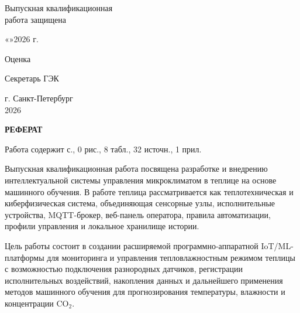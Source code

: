 \documentclass[a4paper,14pt]{extarticle}
\newcommand{\VkrStructuralSectionNoToc}[1]{%
  \begin{center}\bfseries #1\end{center}%
  \par\nopagebreak\vspace{12pt}%
}
\begin{document}
\begin{titlepage}
\vspace{0.4cm}

\begin{flushright}
\begin{minipage}{0.46\textwidth}
Выпускная квалификационная\\
работа защищена

\vspace{0.15cm}

«\underline{\hspace{0.8cm}}»\underline{\hspace{2.5cm}}2026 г.

\vspace{0.18cm}

Оценка

\vspace{0.12cm}

\underline{\hspace{3.0cm}}

\vspace{0.18cm}

Секретарь ГЭК \underline{\hspace{2.2cm}}
\end{minipage}
\end{flushright}

\vfill

\begin{center}
г. Санкт-Петербург\\
2026
\end{center}
\end{titlepage}

\setcounter{page}{2}
\hypersetup{pageanchor=true}

\VkrStructuralSectionNoToc{РЕФЕРАТ}\label{ux440ux435ux444ux435ux440ux430ux442}

Работа содержит \pageref{LastPage} с., 0 рис., 8 табл., 32 источн., 1
прил.

Выпускная квалификационная работа посвящена разработке и внедрению
интеллектуальной системы управления микроклиматом в теплице на основе
машинного обучения. В работе теплица рассматривается как
теплотехническая и киберфизическая система, объединяющая сенсорные узлы,
исполнительные устройства, MQTT-брокер, веб-панель оператора, правила
автоматизации, профили управления и локальное хранилище истории.

Цель работы состоит в создании расширяемой программно-аппаратной
IoT/ML-платформы для мониторинга и управления тепловлажностным режимом
теплицы с возможностью подключения разнородных датчиков, регистрации
исполнительных воздействий, накопления данных и дальнейшего применения
методов машинного обучения для прогнозирования температуры, влажности и
концентрации CO\(_2\).
\end{document}

